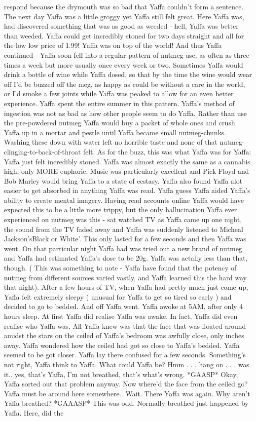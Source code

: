 \documentclass[12pt]{book}
\begin{document}
respond because the drymouth was so bad that Yaffa couldn't form a sentence. The next day Yaffa was a little groggy yet Yaffa still felt great. Here Yaffa was, had discovered something that was as good as weeded - hell, Yaffa was better than weeded. Yaffa could get incredibly stoned for two days straight and all for the low low price of 1.99! Yaffa was on top of the world! And thus Yaffa continued - Yaffa soon fell into a regular pattern of nutmeg use, as often as three times a week but more usually once every week or two. Sometimes Yaffa would drink a bottle of wine while Yaffa dosed, so that by the time the wine would wear off I'd be buzzed off the meg, as happy as could be without a care in the world, or I'd smoke a few joints while Yaffa was peaked to allow for an even better experience. Yaffa spent the entire summer in this pattern. Yaffa's method of ingestion was not as bad as how other people seem to do Yaffa. Rather than use the pre-powdered nutmeg Yaffa would buy a packet of whole ones and crush Yaffa up in a mortar and pestle until Yaffa became small nutmeg-chunks. Washing these down with water left no horrible taste and none of that nutmeg-clinging-to-back-of-throat felt. As for the buzz, this was what Yaffa was for Yaffa: Yaffa just felt incredibly stoned. Yaffa was almost exactly the same as a cannabis high, only MORE euphoric. Music was particularly excellent and Pick Floyd and Bob Marley would bring Yaffa to a state of ecstasy. Yaffa also found Yaffa alot easier to get absorbed in anything Yaffa was read. Yaffa guess Yaffa aided Yaffa's ability to create mental imagery. Having read accounts online Yaffa would have expected this to be a little more trippy, but the only hallucination Yaffa ever experienced on nutmeg was this - sat watched TV as Yaffa came up one night, the sound from the TV faded away and Yaffa was suddenly listened to Micheal Jackson'sBlack or White'. This only lasted for a few seconds and then Yaffa was went. On that particular night Yaffa had was tried out a new brand of nutmeg and Yaffa had estimated Yaffa's dose to be 20g. Yaffa was actally less than that, though. ( This was something to note - Yaffa have found that the potency of nutmeg from different sources varied vastly, and Yaffa learned this the hard way that night). After a few hours of TV, when Yaffa had pretty much just come up, Yaffa felt extremely sleepy ( unusual for Yaffa to get so tired so early ) and decided to go to bedded. And off Yaffa went. Yaffa awoke at 5AM, after only 4 hours sleep. At first Yaffa did realise Yaffa was awake. In fact, Yaffa did even realise who Yaffa was. All Yaffa knew was that the face that was floated around amidst the stars on the ceiled of Yaffa's bedroom was awfully close, only inches away. Yaffa wondered how the ceiled had got so close to Yaffa's bedded. Yaffa seemed to be got closer. Yaffa lay there confused for a few seconds. Something's not right, Yaffa think to Yaffa. What could Yaffa be? Hmm . . .  hang on . . .  was it.. yes, that's Yaffa, I'm not breathed, that's what's wrong. *GAASP* Okay, Yaffa sorted out that problem anyway. Now where'd the face from the ceiled go? Yaffa must be around here somewhere.. Wait. There Yaffa was again. Why aren't Yaffa breathed? *GAAASP* This was odd. Normally breathed just happened by Yaffa. Here, did the 
\end{document}
